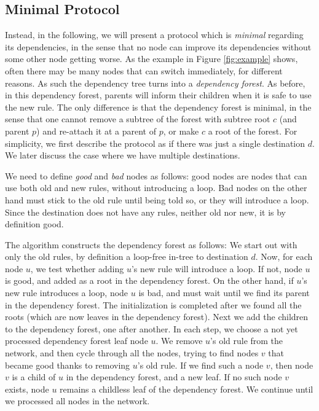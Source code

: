 \subsection{Minimal Protocol}
\label{sec:minimal}

Instead, in the following, we will present a protocol which is \emph{minimal} regarding its dependencies, in the sense that no node can improve its dependencies without some other node getting worse. As the example in Figure \ref{fig:example} shows, often there may be many nodes that can switch immediately, for different reasons. As such the dependency tree turns into a \emph{dependency forest}. As before, in this dependency forest, parents will inform their children when it is safe to use the new rule. The only difference is that the dependency forest is minimal, in the sense that one cannot remove a subtree of the forest with subtree root $c$ (and parent $p$) and re-attach it at a parent of $p$, or make $c$ a root of the forest. For simplicity, we first describe the protocol as if there was just a single destination $d$. We later discuss the case where we have multiple destinations.

We need to define \emph{good} and \emph{bad} nodes as follows: good nodes are nodes that can use both old and new rules, without introducing a loop. Bad nodes on the other hand must stick to the old rule until being told so, or they will introduce a loop. Since the destination does not have any rules, neither old nor new, it is by definition good.

The algorithm constructs the dependency forest as follows: We start out with only the old rules, by definition a loop-free in-tree to destination $d$. Now, for each node $u$, we test whether adding $u$'s new rule will introduce a loop. If not, node $u$ is good, and added as a root in the dependency forest. On the other hand, if $u$'s new rule introduces a loop, node $u$ is bad, and must wait until we find its parent in the dependency forest. The initialization is completed after we found all the roots (which are now leaves in the dependency forest). Next we add the children to the dependency forest, one after another. In each step, we choose a not yet processed dependency forest leaf node $u$. We remove $u$'s old rule from the network, and then cycle through all the nodes, trying to find nodes $v$ that became good thanks to removing $u$'s old rule. If we find such a node $v$, then node $v$ is a child of $u$ in the dependency forest, and a new leaf. If no such node $v$ exists, node $u$ remains a childless leaf of the dependency forest. We continue until we processed all nodes in the network.

